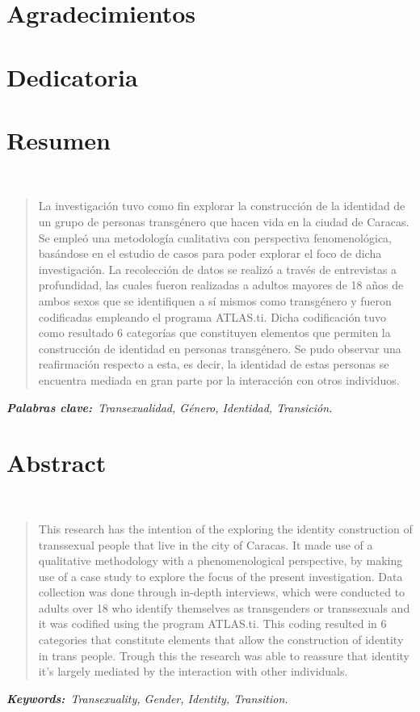 \chapter{Agradecimientos}

\chapter{Dedicatoria}

\chapter{Resumen}
\begin{center}
	\large\scshape\thetitle\
\end{center}

\begin{quote}
La investigación tuvo como fin explorar la construcción de la identidad
de un grupo de personas transgénero que hacen vida en la ciudad de Caracas.
Se empleó una metodología cualitativa con perspectiva fenomenológica, basándose
en el estudio de casos para poder explorar el foco de dicha investigación.
La recolección de datos se realizó a través de entrevistas a profundidad, las
cuales fueron realizadas a adultos mayores de 18 años de ambos sexos que se
identifiquen a sí mismos como transgénero y fueron codificadas empleando el
programa ATLAS.ti\@.
Dicha codificación tuvo como resultado 6 categorías que constituyen elementos
que permiten la construcción de identidad en personas transgénero.
Se pudo observar una reafirmación respecto a esta, es decir, la identidad de
estas personas se encuentra mediada en gran parte por la interacción con otros
individuos.
\end{quote}

\itshape\textbf{Palabras clave:}\normalfont{}\ Transexualidad, Género, Identidad,
Transición.

\chapter{Abstract}

\begin{center}
	\large\scshape\theengtitle\
\end{center}

\begin{quote}
This research has the intention of the exploring the identity construction of
transsexual people that live in the city of Caracas.
It made use of a qualitative methodology with a phenomenological perspective, by
making use of a case study to explore the focus of the present investigation.
Data collection was done through in-depth interviews, which were conducted to
adults over 18 who identify themselves as transgenders or transsexuals and it
was codified using the program ATLAS.ti\@.
This coding resulted in 6 categories that constitute elements that allow the
construction of identity in trans people.
Trough this the research was able to reassure that identity it's largely
mediated by the interaction with other individuals.

\end{quote}

\itshape\textbf{Keywords:}\normalfont{}\ Transexuality, Gender, Identity,
Transition.
